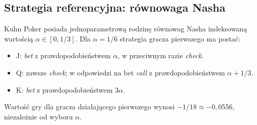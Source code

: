 \documentclass[12pt,a4paper]{article}
\begin{document}
\subsection{Strategia referencyjna: równowaga Nasha}
Kuhn Poker posiada jednoparametrową rodzinę równowag Nasha
indeksowaną wartością $\alpha \in [0, 1/3]$. Dla $\alpha = 1/6$
strategia gracza pierwszego ma postać:
\begin{itemize}
    \item J: \emph{bet} z prawdopodobieństwem $\alpha$, w przeciwnym razie \emph{check}.
    \item Q: zawsze \emph{check}; w odpowiedzi na bet \emph{call} z prawdopodobieństwem $\alpha + 1/3$.
    \item K: \emph{bet} z prawdopodobieństwem $3\alpha$.
\end{itemize}
Wartość gry dla gracza działającego pierwszego wynosi
$-1/18 \approx -0{,}0556$, niezależnie od wyboru $\alpha$.
\end{document}
